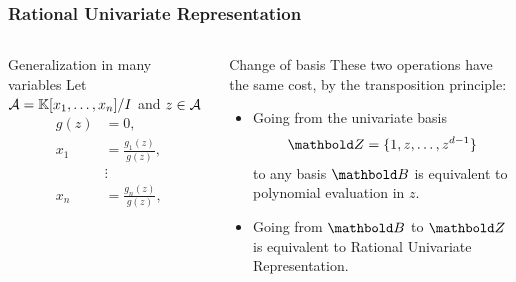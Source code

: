\documentclass[10pt]{beamer}
\begin{document}
\begin{frame}
  \frametitle{Rational Univariate Representation}
  
  \begin{columns}
    \begin{column}{0.45\textwidth}
      \begin{block}{Generalization in many variables \parencite{giusti+lecerf+salvy01,rouiller99}}
        Let $\mathcal{A} = \mathbb{K}[x_1,\ldots,x_n]/I$ and $z\in\mathcal{A}$
        \begin{align*}
          g(z) &= 0\text{,}\\
          x_1 &= \frac{g_1(z)}{g(z)}\text{,}\\
          &\vdots\\
          x_n &= \frac{g_n(z)}{g(z)}\text{,}    
        \end{align*}
      \end{block}
    \end{column}
    \begin{column}{0.45\textwidth}
      \begin{block}{Change of basis}
        These two operations have the same cost, by the transposition
        principle:
        \begin{itemize}
        \item Going from the univariate basis
          \[\basis{Z} = \{1,z,\ldots,z^{d-1}\}\]
          to any basis $\basis{B}$ is equivalent to polynomial
          evaluation in $z$.
        \item Going from $\basis{B}$ to $\basis{Z}$ is equivalent to
          Rational Univariate Representation.
        \end{itemize}
      \end{block}
    \end{column}
  \end{columns}
\end{frame}

\end{document}
